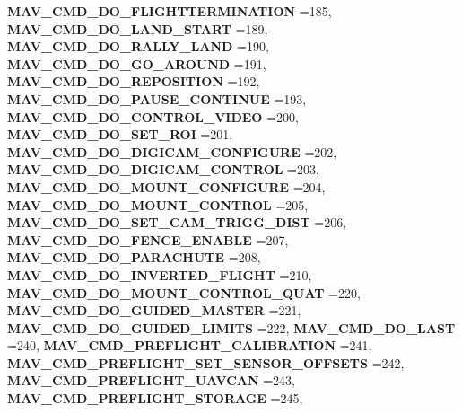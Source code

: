 \begin{DoxyCompactItemize}
\textbf{ M\+A\+V\+\_\+\+C\+M\+D\+\_\+\+D\+O\+\_\+\+F\+L\+I\+G\+H\+T\+T\+E\+R\+M\+I\+N\+A\+T\+I\+ON} =185, 
\newline
\textbf{ M\+A\+V\+\_\+\+C\+M\+D\+\_\+\+D\+O\+\_\+\+L\+A\+N\+D\+\_\+\+S\+T\+A\+RT} =189, 
\textbf{ M\+A\+V\+\_\+\+C\+M\+D\+\_\+\+D\+O\+\_\+\+R\+A\+L\+L\+Y\+\_\+\+L\+A\+ND} =190, 
\textbf{ M\+A\+V\+\_\+\+C\+M\+D\+\_\+\+D\+O\+\_\+\+G\+O\+\_\+\+A\+R\+O\+U\+ND} =191, 
\textbf{ M\+A\+V\+\_\+\+C\+M\+D\+\_\+\+D\+O\+\_\+\+R\+E\+P\+O\+S\+I\+T\+I\+ON} =192, 
\newline
\textbf{ M\+A\+V\+\_\+\+C\+M\+D\+\_\+\+D\+O\+\_\+\+P\+A\+U\+S\+E\+\_\+\+C\+O\+N\+T\+I\+N\+UE} =193, 
\textbf{ M\+A\+V\+\_\+\+C\+M\+D\+\_\+\+D\+O\+\_\+\+C\+O\+N\+T\+R\+O\+L\+\_\+\+V\+I\+D\+EO} =200, 
\textbf{ M\+A\+V\+\_\+\+C\+M\+D\+\_\+\+D\+O\+\_\+\+S\+E\+T\+\_\+\+R\+OI} =201, 
\textbf{ M\+A\+V\+\_\+\+C\+M\+D\+\_\+\+D\+O\+\_\+\+D\+I\+G\+I\+C\+A\+M\+\_\+\+C\+O\+N\+F\+I\+G\+U\+RE} =202, 
\newline
\textbf{ M\+A\+V\+\_\+\+C\+M\+D\+\_\+\+D\+O\+\_\+\+D\+I\+G\+I\+C\+A\+M\+\_\+\+C\+O\+N\+T\+R\+OL} =203, 
\textbf{ M\+A\+V\+\_\+\+C\+M\+D\+\_\+\+D\+O\+\_\+\+M\+O\+U\+N\+T\+\_\+\+C\+O\+N\+F\+I\+G\+U\+RE} =204, 
\textbf{ M\+A\+V\+\_\+\+C\+M\+D\+\_\+\+D\+O\+\_\+\+M\+O\+U\+N\+T\+\_\+\+C\+O\+N\+T\+R\+OL} =205, 
\textbf{ M\+A\+V\+\_\+\+C\+M\+D\+\_\+\+D\+O\+\_\+\+S\+E\+T\+\_\+\+C\+A\+M\+\_\+\+T\+R\+I\+G\+G\+\_\+\+D\+I\+ST} =206, 
\newline
\textbf{ M\+A\+V\+\_\+\+C\+M\+D\+\_\+\+D\+O\+\_\+\+F\+E\+N\+C\+E\+\_\+\+E\+N\+A\+B\+LE} =207, 
\textbf{ M\+A\+V\+\_\+\+C\+M\+D\+\_\+\+D\+O\+\_\+\+P\+A\+R\+A\+C\+H\+U\+TE} =208, 
\textbf{ M\+A\+V\+\_\+\+C\+M\+D\+\_\+\+D\+O\+\_\+\+I\+N\+V\+E\+R\+T\+E\+D\+\_\+\+F\+L\+I\+G\+HT} =210, 
\textbf{ M\+A\+V\+\_\+\+C\+M\+D\+\_\+\+D\+O\+\_\+\+M\+O\+U\+N\+T\+\_\+\+C\+O\+N\+T\+R\+O\+L\+\_\+\+Q\+U\+AT} =220, 
\newline
\textbf{ M\+A\+V\+\_\+\+C\+M\+D\+\_\+\+D\+O\+\_\+\+G\+U\+I\+D\+E\+D\+\_\+\+M\+A\+S\+T\+ER} =221, 
\textbf{ M\+A\+V\+\_\+\+C\+M\+D\+\_\+\+D\+O\+\_\+\+G\+U\+I\+D\+E\+D\+\_\+\+L\+I\+M\+I\+TS} =222, 
\textbf{ M\+A\+V\+\_\+\+C\+M\+D\+\_\+\+D\+O\+\_\+\+L\+A\+ST} =240, 
\textbf{ M\+A\+V\+\_\+\+C\+M\+D\+\_\+\+P\+R\+E\+F\+L\+I\+G\+H\+T\+\_\+\+C\+A\+L\+I\+B\+R\+A\+T\+I\+ON} =241, 
\newline
\textbf{ M\+A\+V\+\_\+\+C\+M\+D\+\_\+\+P\+R\+E\+F\+L\+I\+G\+H\+T\+\_\+\+S\+E\+T\+\_\+\+S\+E\+N\+S\+O\+R\+\_\+\+O\+F\+F\+S\+E\+TS} =242, 
\textbf{ M\+A\+V\+\_\+\+C\+M\+D\+\_\+\+P\+R\+E\+F\+L\+I\+G\+H\+T\+\_\+\+U\+A\+V\+C\+AN} =243, 
\textbf{ M\+A\+V\+\_\+\+C\+M\+D\+\_\+\+P\+R\+E\+F\+L\+I\+G\+H\+T\+\_\+\+S\+T\+O\+R\+A\+GE} =245, 

\end{DoxyCompactItemize}
